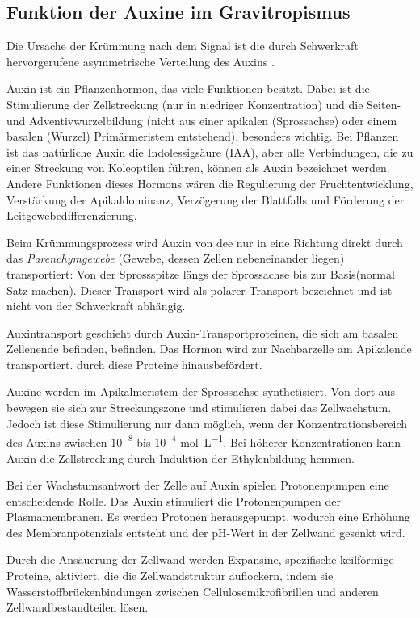 \documentclass[
a4paper, 
11pt, 
ngerman,
listof=totoc,
bibliography=totocnumbered,
abstracton
]{scrreprt}
\begin{document}
\subsection{Funktion der Auxine im Gravitropismus}

Die Ursache der Krümmung nach dem Signal ist die durch Schwerkraft hervorgerufene asymmetrische Verteilung des Auxins  \parencite[502f]{Nultsch}.

Auxin ist ein Pflanzenhormon, das viele Funktionen besitzt. Dabei ist die Stimulierung der Zellstreckung (nur in niedriger Konzentration) und die Seiten- und Adventivwurzelbildung (nicht aus einer apikalen (Sprossachse) oder einem basalen (Wurzel) Primärmeristem entstehend), besonders wichtig. 
Bei Pflanzen ist das natürliche Auxin die Indolessigsäure (IAA), aber alle Verbindungen, die zu einer Streckung von Koleoptilen führen, können als Auxin bezeichnet werden.
Andere Funktionen dieses Hormons wären die Regulierung der Fruchtentwicklung, Verstärkung der Apikaldominanz, Verzögerung der Blattfalls und Förderung der Leitgewebedifferenzierung.

Beim Krümmungsprozess wird Auxin von dee nur in eine Richtung direkt durch das  \emph{Parenchymgewebe} (Gewebe, dessen Zellen nebeneinander liegen) transportiert: Von der Sprossspitze längs der Sprossachse bis zur Basis(normal Satz machen). Dieser Transport wird als polarer Transport bezeichnet und ist nicht von der Schwerkraft abhängig.

Auxintransport geschieht durch Auxin-Transportproteinen, die sich am basalen Zellenende befinden, befinden.
Das Hormon wird zur Nachbarzelle am Apikalende transportiert.  durch diese Proteine hinausbefördert.

Auxine werden im Apikalmeristem der Sprossachse synthetisiert. Von dort aus bewegen sie sich zur Streckungszone und stimulieren dabei das Zellwachstum.
Jedoch ist diese Stimulierung nur dann möglich, wenn der Konzentrationsbereich des Auxins zwischen $10^{-8}$ bis $10^{-4}$ \si{\mole\per\L}. Bei höherer Konzentrationen kann Auxin die Zellstreckung durch Induktion der Ethylenbildung hemmen.

Bei der Wachstumsantwort der Zelle auf Auxin spielen Protonenpumpen eine entscheidende Rolle. Das Auxin stimuliert die Protonenpumpen der Plasmamembranen. Es werden Protonen herausgepumpt, wodurch eine Erhöhung des Membranpotenzials entsteht und der pH-Wert in der Zellwand gesenkt wird. 

Durch die Ansäuerung  der Zellwand werden Expansine, spezifische keilförmige Proteine, aktiviert, die die Zellwandstruktur auflockern, indem sie Wasserstoffbrückenbindungen zwischen Cellulosemikrofibrillen und anderen Zellwandbestandteilen lösen.
\end{document}
